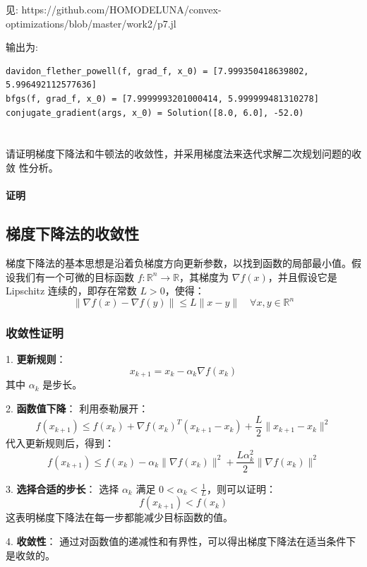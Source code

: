 \documentclass[a4paper]{article}
\begin{document}
见: https://github.com/HOMODELUNA/convex-optimizations/blob/master/work2/p7.jl

输出为:
\begin{lstlisting}
davidon_flether_powell(f, grad_f, x_0) = [7.999350418639802, 5.996492112577636]
bfgs(f, grad_f, x_0) = [7.9999993201000414, 5.999999481310278]
conjugate_gradient(args, x_0) = Solution([8.0, 6.0], -52.0)
\end{lstlisting}

\section{}
请证明梯度下降法和牛顿法的收敛性，并采用梯度法来迭代求解二次规划问题的收敛
性分析。

\paragraph{证明}

\subsection{梯度下降法的收敛性}

梯度下降法的基本思想是沿着负梯度方向更新参数，以找到函数的局部最小值。假设我们有一个可微的目标函数 $f: \mathbb{R}^n \to \mathbb{R}$，其梯度为 $\nabla f(x)$，并且假设它是 Lipschitz 连续的，即存在常数 $L > 0$，使得：
\[
\|\nabla f(x) - \nabla f(y)\| \leq L \|x - y\| \quad \forall x, y \in \mathbb{R}^n
\]

\subsubsection{收敛性证明}

1. \textbf{更新规则}：
   \[
   x_{k+1} = x_k - \alpha_k \nabla f(x_k)
   \]
   其中 $\alpha_k$ 是步长。

2. \textbf{函数值下降}：
   利用泰勒展开：
   \[
   f(x_{k+1}) \leq f(x_k) + \nabla f(x_k)^T (x_{k+1} - x_k) + \frac{L}{2} \|x_{k+1} - x_k\|^2
   \]
   代入更新规则后，得到：
   \[
   f(x_{k+1}) \leq f(x_k) - \alpha_k \|\nabla f(x_k)\|^2 + \frac{L \alpha_k^2}{2} \|\nabla f(x_k)\|^2
   \]

3. \textbf{选择合适的步长}：
   选择 $\alpha_k$ 满足 $0 < \alpha_k < \frac{1}{L}$，则可以证明：
   \[
   f(x_{k+1}) < f(x_k)
   \]
   这表明梯度下降法在每一步都能减少目标函数的值。

4. \textbf{收敛性}：
   通过对函数值的递减性和有界性，可以得出梯度下降法在适当条件下是收敛的。
\end{document}

